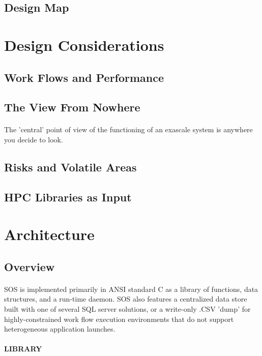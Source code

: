 \documentclass{acmtog}
\begin{document}
\subsection{Design Map}
\paragraph{}
\section{Design Considerations}
\subsection{Work Flows and Performance}
\subsection{The View From Nowhere}
\paragraph{}The 'central' point of view of the functioning of an exascale system is anywhere you decide to look.
\subsection{Risks and Volatile Areas}
\subsection{HPC Libraries as Input}
\section{Architecture}
\subsection{Overview}
\paragraph{}SOS is implemented primarily in ANSI standard C as a library of functions, data structures, and a run-time daemon.  SOS also features a centralized data store built with one of several SQL server solutions, or a write-only .CSV 'dump' for highly-constrained work flow execution environments that do not support heterogeneous application launches.
\paragraph{LIBRARY}
\end{document}
